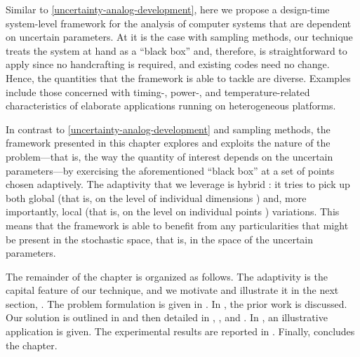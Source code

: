 Similar to \cref{uncertainty-analog-development}, here we propose a design-time
system-level framework for the analysis of computer systems that are dependent
on uncertain parameters. At it is the case with sampling methods, our technique
treats the system at hand as a ``black box'' and, therefore, is straightforward
to apply since no handcrafting is required, and existing codes need no change.
Hence, the quantities that the framework is able to tackle are diverse. Examples
include those concerned with timing-, power-, and temperature-related
characteristics of elaborate applications running on heterogeneous platforms.

In contrast to \cref{uncertainty-analog-development} and sampling methods, the
framework presented in this chapter explores and exploits the nature of the
problem---that is, the way the quantity of interest depends on the uncertain
parameters---by exercising the aforementioned ``black box'' at a set of points
chosen adaptively. The adaptivity that we leverage is hybrid \cite{jakeman2012}:
it tries to pick up both global (that is, on the level of individual dimensions
\cite{klimke2006}) and, more importantly, local (that is, on the level on
individual points \cite{ma2009}) variations. This means that the framework is
able to benefit from any particularities that might be present in the stochastic
space, that is, in the space of the uncertain parameters.

The remainder of the chapter is organized as follows. The adaptivity is the
capital feature of our technique, and we motivate and illustrate it in the next
section, . The problem formulation is given in
. In , the prior work is
discussed. Our solution is outlined in  and then
detailed in , ,
and . In , an
illustrative application is given. The experimental results are reported in
. Finally,  concludes the
chapter.
